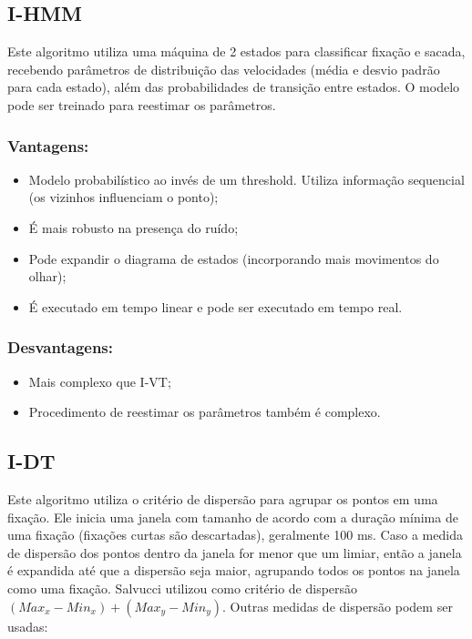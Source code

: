 \subsection{I-HMM}\label{i-hmm}

Este algoritmo utiliza uma máquina de 2 estados para classificar fixação
e sacada, recebendo parâmetros de distribuição das velocidades (média e
desvio padrão para cada estado), além das probabilidades de transição
entre estados. O modelo pode ser treinado para reestimar os parâmetros.

\subsubsection{Vantagens:}\label{vantagens-1}

\begin{itemize}
\itemsep1pt\parskip0pt
\item
  Modelo probabilístico ao invés de um threshold. Utiliza informação
  sequencial (os vizinhos influenciam o ponto);
\item
  É mais robusto na presença do ruído;
\item
  Pode expandir o diagrama de estados (incorporando mais movimentos do
  olhar);
\item
  É executado em tempo linear e pode ser executado em tempo real.
\end{itemize}

\subsubsection{Desvantagens:}\label{desvantagens-1}

\begin{itemize}
\itemsep1pt\parskip0pt
\item
  Mais complexo que I-VT;
\item
  Procedimento de reestimar os parâmetros também é complexo.
\end{itemize}

\subsection{I-DT}\label{i-dt}

Este algoritmo utiliza o critério de dispersão para agrupar os pontos em
uma fixação. Ele inicia uma janela com tamanho de acordo com a duração
mínima de uma fixação (fixações curtas são descartadas), geralmente 100
ms. Caso a medida de dispersão dos pontos dentro da janela for menor que
um limiar, então a janela é expandida até que a dispersão seja maior,
agrupando todos os pontos na janela como uma fixação. Salvucci utilizou
como critério de dispersão $(Max_x - Min_x) + (Max_y - Min_y)$. Outras
medidas de dispersão podem ser usadas:

